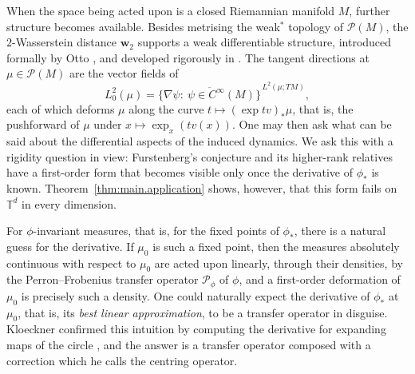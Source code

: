 \documentclass[11pt,reqno]{amsart}
\theoremstyle{plain}
\theoremstyle{definition}
\newcommand{\dw}{\mathbf{w}_2}
\newcommand{\T}{\mathbb{T}}
\newcommand{\Prob}{\mathcal{P}}
\newcommand{\PF}{\mathcal{P}}
\begin{document}
When the space being acted upon is a closed Riemannian manifold \( M \), further structure becomes available.
Besides metrising the weak\( ^\ast \) topology of \( \Prob(M) \), the \( 2 \)-Wasserstein distance \( \dw \) supports a weak differentiable structure, introduced formally by Otto \cite{otto_geometry_2001}, and developed rigorously in \cite{ambrosio_gradient_2008,lott_geometric_2008,gigli_second_2012,gomes_differential_2024}.
The tangent directions at \( \mu\in\Prob(M) \) are the vector fields of
\[
    L^2_0(\mu)=\overline{\{\nabla\psi:\ \psi\in C^\infty(M)\}}^{\,L^2(\mu;TM)},
\]
each of which deforms \( \mu \) along the curve \( t\mapsto(\exp tv)_\ast\mu \), that is, the pushforward of \( \mu \) under \( x\mapsto\exp_x(tv(x)) \).
One may then ask what can be said about the differential aspects of the induced dynamics. 
We ask this with a rigidity question in view: Furstenberg's conjecture \cite{furstenberg_disjointness_1967} and its higher-rank relatives have a first-order form that becomes visible only once the derivative of \( \phi_\ast \) is known.
Theorem~\ref{thm:main.application} shows, however, that this form fails on \( \T^d \) in every dimension.

For \( \phi \)-invariant measures, that is, for the fixed points of \( \phi_\ast \), there is a natural guess for the derivative.
If \( \mu_0 \) is such a fixed point, then the measures absolutely continuous with respect to \( \mu_0 \) are acted upon linearly, through their densities, by the Perron--Frobenius transfer operator \( \PF_{\phi} \) of \( \phi \), and a first-order deformation of \( \mu_0 \) is precisely such a density.
One could naturally expect the derivative of \( \phi_\ast \) at \( \mu_0 \), that is, its \emph{best linear approximation}, to be a transfer operator in disguise.
Kloeckner confirmed this intuition by computing the derivative for expanding maps of the circle \cite[Theorem 5.1]{kloeckner_optimal_2013}, and the answer is a transfer operator composed with a correction which he calls the centring operator.
\end{document}
